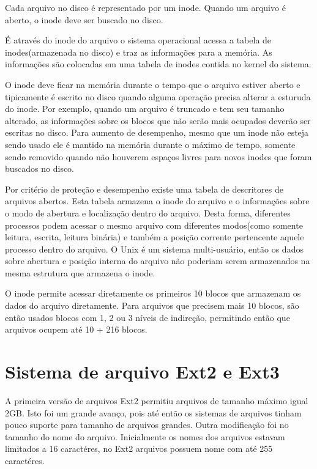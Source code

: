 Cada arquivo no disco é representado por um inode. Quando um arquivo é aberto, o inode deve ser buscado no disco.

É através do inode do arquivo o sistema operacional acessa a tabela de inodes(armazenada no disco) e traz as informações para a memória. As informações são colocadas em uma tabela de inodes contida no kernel do sistema.

O inode deve ficar na memória durante o tempo que o arquivo estiver aberto e tipicamente é escrito no disco quando alguma operação precisa alterar a esturuda do inode. Por exemplo, quando um arquivo é truncado e tem seu tamanho alterado, as informações sobre os blocos que não serão mais ocupados deverão ser escritas no disco. Para aumento de desempenho, mesmo que um inode não esteja sendo usado ele é mantido na memória durante o máximo de tempo, somente sendo removido quando não houverem espaços livres para novos inodes que foram buscados no disco.

Por critério de proteção e desempenho existe uma tabela de descritores de arquivos abertos. Esta tabela armazena o inode do arquivo e o informações sobre o modo de abertura e localização dentro do arquivo. Desta forma, diferentes processos podem acessar o mesmo arquivo com diferentes modos(como somente leitura, escrita, leitura binária) e também a posição corrente pertencente aquele processo dentro do arquivo. O Unix é um sistema multi-usuário, então os dados sobre abertura e posição interna do arquivo não poderiam serem armazenados na mesma estrutura que armazena o inode.

O inode permite acessar diretamente os primeiros 10 blocos que armazenam os dados do arquivo diretamente. Para arquivos que precisem mais 10 blocos, são então usados blocos com 1, 2 ou 3 níveis de indireção, permitindo então que arquivos ocupem até 10 + 216 blocos.

\section{Sistema de arquivo Ext2 e Ext3}

A primeira versão de arquivos Ext2 permitiu arquivos de tamanho máximo igual 2GB. Isto foi um grande avanço, pois até então os sistemas de arquivos tinham pouco suporte para tamanho de arquivos grandes. Outra modificação foi no tamanho do nome do arquivo. Inicialmente os nomes dos arquivos estavam limitados a 16 caractéres, no Ext2 arquivos possuem nome com até 255 caractéres.


